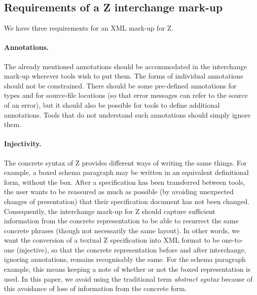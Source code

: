 \documentclass{llncs}  %
\begin{document}
\subsection{Requirements of a Z interchange mark-up}\label{injectivity}

We have three requirements for an XML mark-up for Z.
 
\paragraph{Annotations.}
The already mentioned annotations should be accommodated
in the interchange mark-up wherever tools wish to put them.
The forms of individual annotations should not be constrained.
There should be some pre-defined annotations for types and for
source-file locations (so that error messages can refer to the
source of an error), but it should also be possible for tools
to define additional annotations.  Tools that do not understand
such annotations should simply ignore them.

\paragraph{Injectivity.}
The concrete syntax of Z provides different ways of writing the 
same things.  For example, a boxed schema paragraph
may be written in an equivalent definitional form, without the box.
After a specification has been transferred between tools, the user wants
to be reassured as much as possible (by avoiding unexpected changes 
of presentation) that their specification document has not been changed.
Consequently, the interchange mark-up for Z should capture
sufficient information from the concrete representation 
to be able to resurrect the same concrete phrases
(though not necessarily the same layout).
In other words, we want the conversion of a textual Z specification into 
XML format to be one-to-one (injective), so that the concrete 
representation before and after interchange, ignoring annotations,
remains recognisably the same.
For the schema paragraph example, this means keeping a note of whether 
or not the boxed representation is used. 
In this paper, we avoid using the traditional term \textit{abstract syntax}
because of this avoidance of loss of information from the concrete form.
\end{document}
